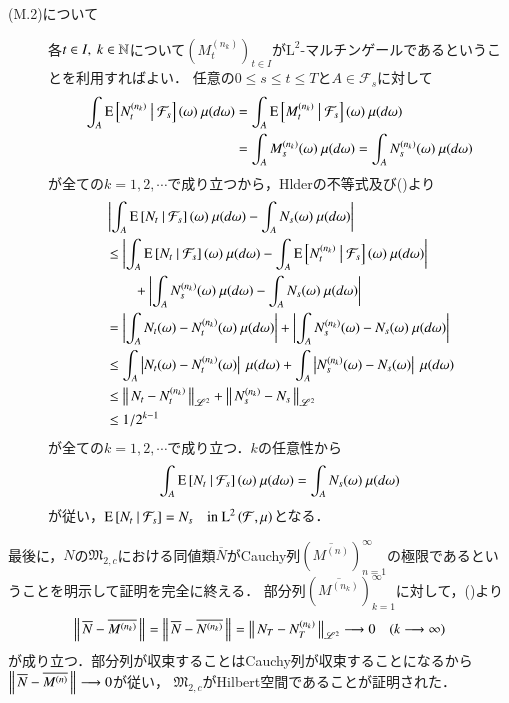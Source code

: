 \begin{prf}
\begin{description}
			\item[(M.2)について]
				各$t \in I,\ k \in \mathbb{N}$について$(M^{(n_k)}_t)_{t \in I}$が$\mathrm{L}^2$-マルチンゲールであるということを利用すればよい．
				任意の$0 \leq s \leq t \leq T$と$A \in \mathcal{F}_s$に対して
				\begin{align}
					\int_{A} \cexp{N^{(n_k)}_t}{\mathcal{F}_s}(\omega)\ \mu(d\omega) &= \int_{A} \cexp{M^{(n_k)}_t}{\mathcal{F}_s}(\omega)\ \mu(d\omega) \\
					&= \int_{A} M^{(n_k)}_s(\omega)\ \mu(d\omega) = \int_{A} N^{(n_k)}_s(\omega)\ \mu(d\omega)
				\end{align}
				が全ての$k = 1,2,\cdots$で成り立つから，Hlderの不等式及び()より
				\begin{align}
					&\left| \int_{A} \cexp{N_t}{\mathcal{F}_s}(\omega)\ \mu(d\omega) - \int_{A} N_s(\omega)\ \mu(d\omega) \right| \\
					&\leq \left| \int_{A} \cexp{N_t}{\mathcal{F}_s}(\omega)\ \mu(d\omega) - \int_{A} \cexp{N^{(n_k)}_t}{\mathcal{F}_s}(\omega)\ \mu(d\omega) \right| \\
						&\qquad+ \left| \int_{A} N^{(n_k)}_s(\omega)\ \mu(d\omega) - \int_{A} N_s(\omega)\ \mu(d\omega) \right| \\
					&= \left| \int_{A} N_t(\omega) - N^{(n_k)}_t(\omega)\ \mu(d\omega) \right|
						+ \left| \int_{A} N^{(n_k)}_s(\omega) - N_s(\omega)\ \mu(d\omega) \right| \\
					&\leq \int_{A} \left| N_t(\omega) - N^{(n_k)}_t(\omega) \right|\ \mu(d\omega)
						+ \int_{A} \left| N^{(n_k)}_s(\omega) - N_s(\omega) \right|\ \mu(d\omega) \\
					&\leq \Norm{N_t - N^{(n_k)}_t}{\mathscr{L}^2} + \Norm{N^{(n_k)}_s - N_s}{\mathscr{L}^2} \\
					&\leq 1/2^{k-1}
				\end{align}
				が全ての$k = 1,2,\cdots$で成り立つ．$k$の任意性から
				\begin{align}
					\int_{A} \cexp{N_t}{\mathcal{F}_s}(\omega)\ \mu(d\omega)
					= \int_{A} N_s(\omega)\ \mu(d\omega)
				\end{align}
				が従い，$\operatorname{E} \left[ N_t \ \middle|\ \mathcal{F}_s \right] = N_s \quad \mbox{in $\operatorname{L}^{2} \left(\mathcal{F},\mu\right)$}$となる．
		\end{description}
	
		最後に，$N$の$\mathfrak{M}_{2,c}$における同値類$\overline{N}$がCauchy列$\left(\overline{M^{(n)}}\right)_{n=1}^{\infty}$の極限であるということを明示して証明を完全に終える．
		部分列$\left(\overline{M^{(n_k)}}\right)_{k=1}^{\infty}$に対して，()より
		\begin{align}
				\left\|\, \overline{N} - \overline{M^{(n_k)}}\, \right\|_{} 
				= \left\|\, \overline{N} - \overline{N^{(n_k)}}\, \right\|_{}
				= \left\|\, N_T - N^{(n_k)}_T\, \right\|_{\mathscr{L}^2} \longrightarrow 0 \quad (k \longrightarrow \infty)
		\end{align}
		が成り立つ．部分列が収束することはCauchy列が収束することになるから$\left\|\, \overline{N} - \overline{M^{(n)}}\, \right\|_{} \longrightarrow 0$が従い，
		$\mathfrak{M}_{2,c}$がHilbert空間であることが証明された．
		\QED
	\end{prf}
